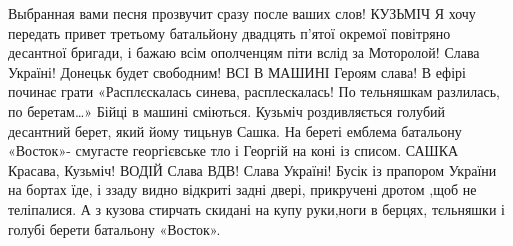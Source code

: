 Выбранная вами песня прозвучит сразу после ваших слов!
КУЗЬМІЧ
Я хочу передать привет третьому батальйону двадцять п'ятої окремої повітряно десантної бригади, і  бажаю всім ополченцям піти вслід за Моторолой! Слава Україні! Донецьк будет свободним!
ВСІ В МАШИНІ
Героям слава!
В ефірі починає грати «Расплєскалась синева, расплескалась! По тельняшкам разлилась, по беретам…»
Бійці в машині сміються. Кузьміч роздивляється голубий десантний берет, який йому тицьнув Сашка.
На береті  емблема батальону «Восток»- смугасте георгієвське тло і Георгій на коні із списом.
САШКА
Красава, Кузьміч!
ВОДІЙ
Слава ВДВ! Слава Україні!
Бусік із прапором України на бортах їде, і ззаду видно відкриті задні двері, прикручені дротом ,щоб не теліпалися. А з кузова стирчать скидані на купу руки,ноги в берцях, тєльняшки і голубі берети батальону «Восток».
\restorecr
